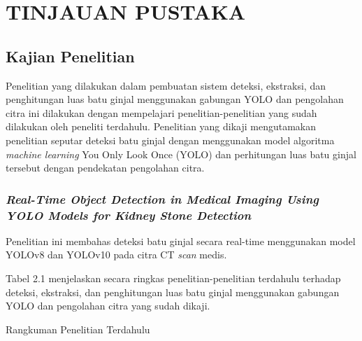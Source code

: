 \chapter{TINJAUAN PUSTAKA}

\section{Kajian Penelitian}

Penelitian yang dilakukan dalam pembuatan sistem deteksi, ekstraksi,
dan penghitungan luas batu ginjal menggunakan gabungan YOLO dan pengolahan
citra ini dilakukan dengan mempelajari penelitian-penelitian yang
sudah dilakukan oleh peneliti terdahulu. Penelitian yang dikaji mengutamakan
penelitian seputar deteksi batu ginjal dengan menggunakan model algoritma
\emph{machine learning} You Only Look Once (YOLO) dan perhitungan
luas batu ginjal tersebut dengan pendekatan pengolahan citra.

\subsection{\emph{Real-Time Object Detection in Medical Imaging Using YOLO Models
for Kidney Stone Detection} \citep{billah12s}}

Penelitian ini membahas deteksi batu ginjal secara real-time menggunakan
model YOLOv8 dan YOLOv10 pada citra CT \emph{scan} medis.

\vspace{20pt}

Tabel 2.1 menjelaskan secara ringkas penelitian-penelitian terdahulu
terhadap deteksi, ekstraksi, dan penghitungan luas batu ginjal menggunakan
gabungan YOLO dan pengolahan citra yang sudah dikaji.

\vspace{-10pt}

\begin{table}[H]
\begin{spacing}{0}
\caption{Rangkuman Penelitian Terdahulu}
\end{spacing}
\end{table}

